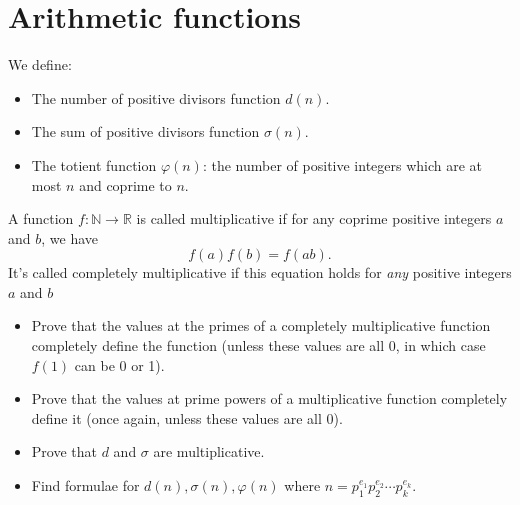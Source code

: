 \documentclass{article}
\begin{document}
\section{Arithmetic functions}
  We define:
  \begin{itemize}
    \item The number of positive divisors function $d(n)$.
    \item The sum of positive divisors function $\sigma(n)$.
    \item The totient function $\varphi(n)$: the number of positive integers
      which are at most $n$ and coprime to $n$.
  \end{itemize}
  A function $f:\mathbb N\to\mathbb R$ is called multiplicative if for any
  coprime positive integers $a$ and $b$, we have
  \[f(a)f(b)=f(ab).\]
  It's called completely multiplicative if this equation holds for \emph{any}
  positive integers $a$ and $b$
  \begin{itemize}
    \item Prove that the values at the primes of a completely multiplicative
      function completely define the function (unless these values are all 0, in
      which case $f(1)$ can be 0 or 1).
    \item Prove that the values at prime powers of a multiplicative function
      completely define it (once again, unless these values are all 0).
    \item Prove that $d$ and $\sigma$ are multiplicative.
    \item
      Find formulae for $d(n),\sigma(n),\varphi(n)$ where
      $n=p_1^{e_1}p_2^{e_2}\cdots p_k^{e_k}$.
  \end{itemize}
\end{document}
